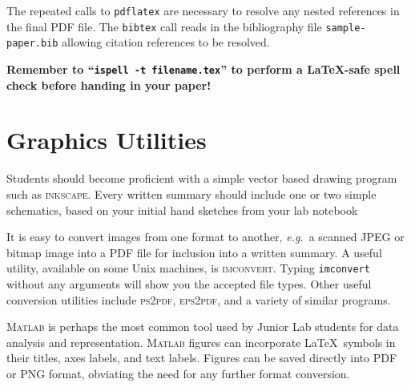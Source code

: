 The repeated calls to \texttt{pdflatex} are necessary to resolve any nested
references in the final PDF file.  The \texttt{bibtex} call reads in the
bibliography file \texttt{sample-paper.bib} allowing citation references to
be resolved.

\textbf{Remember to ``\texttt{ispell -t filename.tex}'' to perform a \LaTeX -safe spell check before handing in your paper!}

\section{Graphics Utilities}

Students should become proficient with a simple vector based
drawing program such as \textsc{inkscape}.
Every written summary should include one or two simple schematics,
based on your initial hand sketches from your lab notebook


It is easy to  convert images from one format to another, \textit{e.g.}\ a
scanned JPEG or bitmap image into a PDF file for inclusion into a
written summary.  A useful utility, available on some Unix machines,  is
\textsc{imconvert}. Typing \texttt{imconvert} without any arguments will show
you the accepted file types.  
Other useful conversion utilities include \textsc{ps2pdf}, \textsc{eps2pdf}, and a variety of similar programs.

\textsc{Matlab} is perhaps the most common tool used by Junior Lab students
for data analysis and representation.  \textsc{Matlab} figures can
incorporate \LaTeX\ symbols in their titles, axes labels, and text
labels.  Figures can be saved directly into PDF or PNG 
format, obviating the need for any further format conversion.

